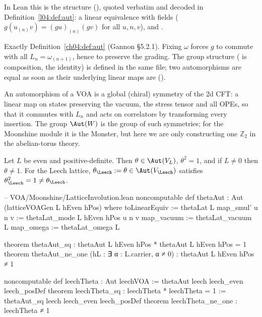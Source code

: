 In Lean this is the structure  (), quoted
verbatim and decoded in Definition~\ref{l04:def:aut}: a linear equivalence 
with fields  ($g(u_{(n)}v)=(gu)_{(n)}(gv)$ for all $u,n,v$), 
and .

\begin{dictionary}
Exactly Definition~\ref{ch04:def:aut} (Gannon \S5.2.1). Fixing $\omega$ forces $g$ to commute with
all $L_n=\omega_{(n+1)}$, hence to preserve the grading. The group structure (\lean{*} is
composition,  the identity) is defined in the same file; two automorphisms are equal as
soon as their underlying linear maps are ().
\end{dictionary}

\begin{physics}
An automorphism of a VOA is a global (chiral) symmetry of the 2d CFT: a linear map on states preserving the vacuum, the stress tensor and all OPEs, so that it commutes with $L_n$ and acts on correlators by transforming every insertion. The group $\Aut(W)$ is the group of such symmetries; for the Moonshine module it is the Monster, but here we are only constructing one $\mathbb Z_2$ in the abelian-torus theory.
\end{physics}

\begin{theorem}\label{ch04:thm:thetaAut}
Let $L$ be even and positive-definite. Then $\theta\in\Aut(V_L)$, $\theta^2=1$, and if $L\neq0$
then $\theta\neq1$. For the Leech lattice, $\theta_\Leech:=\theta\in\Aut(V_\Leech)$ satisfies
$\theta_\Leech^2=1\neq\theta_\Leech$.
\end{theorem}

\begin{leancode}
-- VOA/Moonshine/LatticeInvolution.lean
noncomputable def thetaAut : Aut (latticeVOAGen L hEven hPos) where
  toLinearEquiv := thetaLat L
  map_smul' u n v := thetaLat_mode L hEven hPos u n v
  map_vacuum := thetaLat_vacuum L
  map_omega := thetaLat_omega L

theorem thetaAut_sq : thetaAut L hEven hPos * thetaAut L hEven hPos = 1
theorem thetaAut_ne_one (hL : ∃ α : L.carrier, α ≠ 0) : thetaAut L hEven hPos ≠ 1

noncomputable def leechTheta : Aut leechVOA := thetaAut leech leech_even leech_posDef
theorem leechTheta_sq : leechTheta * leechTheta = 1 := thetaAut_sq leech leech_even leech_posDef
theorem leechTheta_ne_one : leechTheta ≠ 1
\end{leancode}

